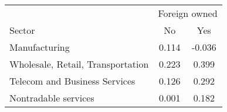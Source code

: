 \begin{tabular}{lcc}
\toprule
 & \multicolumn{2}{c}{Foreign owned} \\
\cmidrule(lr){2-3}
Sector & No & Yes \\
\midrule
Manufacturing & 0.114 & -0.036 \\
Wholesale, Retail, Transportation & 0.223 & 0.399 \\
Telecom and Business Services & 0.126 & 0.292 \\
Nontradable services & 0.001 & 0.182 \\
\bottomrule
\end{tabular}
